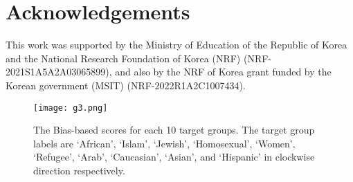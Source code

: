 \documentclass[11pt]{article}
\begin{document}
\section*{Acknowledgements}
This work was supported by the Ministry of Education of the Republic of Korea and the National Research Foundation of Korea (NRF) (NRF-2021S1A5A2A03065899), and also by the NRF of Korea grant funded by the Korean government (MSIT) (NRF-2022R1A2C1007434). \\





\clearpage
\setcounter{table}{0}
\renewcommand{\thetable}{A\arabic{table}}
\setcounter{figure}{0}
\renewcommand{\thefigure}{A\arabic{figure}}
\renewcommand*{\thepage}{A\arabic{page}}

\appendix

\label{sec:appendix} 






















\vspace{-4cm}

\begin{figure*}[!b]
\centering 
\texttt{[image: g3.png]}
\caption{The Bias-based scores for each 10 target groups. The target group labels are `African', `Islam', `Jewish',
`Homosexual', `Women', `Refugee', `Arab', `Caucasian', `Asian', and `Hispanic' in clockwise direction respectively.}
\label{bias_graph_all}
\end{figure*}

\vspace{4cm}
\end{document}
